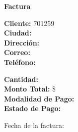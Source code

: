 \documentclass{article}
\begin{document}
\begin{center}
    {\LARGE \textbf{Factura}}\\[1cm]
\end{center}

\textbf{Cliente:} 701259 \\
\textbf{Ciudad:}  \\
\textbf{Dirección:}  \\
\textbf{Correo:}  \\
\textbf{Teléfono:}  \\

\vspace{0.5cm}

\textbf{Cantidad:}  \\
\textbf{Monto Total:} \$  \\
\textbf{Modalidad de Pago:}  \\
\textbf{Estado de Pago:}  \\

\vspace{1cm}

Fecha de la factura: 
\end{document}
